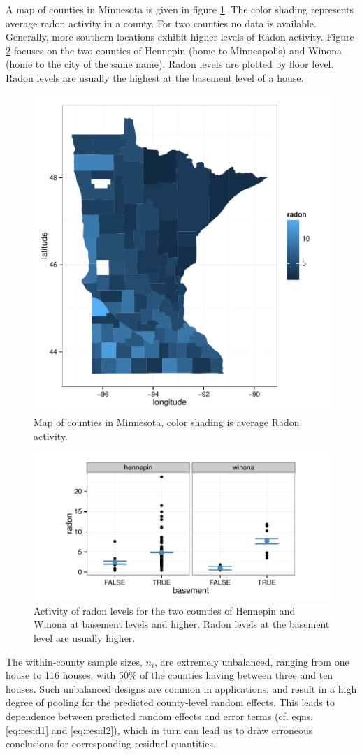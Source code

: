 \documentclass[11pt]{article} %
\newcommand{\cov}{\ensuremath{\mathrm{Cov}}}
\begin{document}
A map of counties in Minnesota is given in figure \ref{fig:map}. The color shading represents average radon activity in a county. For two counties no data is available. Generally, more southern locations exhibit higher  levels of Radon activity. Figure \ref{fig:tc} focuses on the two counties of Hennepin (home to Minneapolis) and Winona (home to the city of the same name). Radon levels are plotted by floor level. Radon levels are usually the highest at the basement level of a house. 
%
\begin{figure}[htb]
\centering
\includegraphics[width=0.5\linewidth]{figures/map.pdf}
\caption{\label{fig:map} Map of counties in Minnesota, color shading is average Radon activity.}
\end{figure}
%
\begin{figure}[htb]
\centering
\includegraphics[width=0.8\linewidth]{figures/radon-twocounties.pdf}
\caption{\label{fig:tc} Activity of radon levels for the two counties of Hennepin and Winona at basement levels and higher. Radon levels at the basement level are usually higher.}
\end{figure}
%
The within-county sample sizes, $n_i$, are extremely unbalanced, ranging from one house to 116 houses, with 50\% of the counties having between three and ten houses. Such unbalanced designs are common in applications, and result in a high degree of pooling for the predicted county-level random effects. %
This leads to dependence between  predicted random effects and  error terms (cf. eqns. \ref{eq:resid1} and \ref{eq:resid2}), which in turn can lead us to draw erroneous conclusions for corresponding residual quantities.
\end{document}
